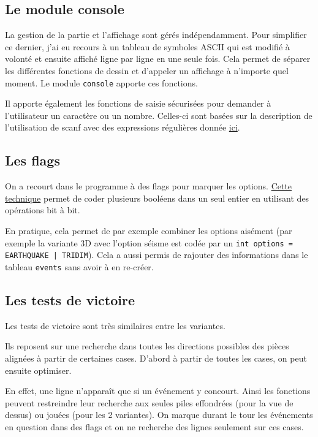 \documentclass[a4paper, titlepage]{article}
\begin{document}
\subsection{Le module console}
La gestion de la partie et l'affichage sont gérés indépendamment. Pour simplifier ce dernier, j'ai eu recours à un tableau de symboles ASCII qui est modifié à volonté et ensuite affiché ligne par ligne en une seule fois. Cela permet de séparer les différentes fonctions de dessin et d'appeler un affichage à n'importe quel moment. Le module \texttt{console} apporte ces fonctions.

Il apporte également les fonctions de saisie sécurisées pour demander à l'utilisateur un caractère ou un nombre. Celles-ci sont basées sur la description de l'utilisation de scanf avec des expressions régulières donnée \href{https://openclassrooms.com/courses/la-saisie-securisee-avec-scanf}{ici}.

\subsection{Les flags}
On a recourt dans le programme à des flags pour marquer les options. \href{https://openclassrooms.com/courses/les-flags-4}{Cette technique} permet de coder plusieurs booléens dans un seul entier en utilisant des opérations bit à bit. 

En pratique, cela permet de par exemple combiner les options aisément (par exemple la variante 3D avec l'option séisme est codée par un \texttt{int options = EARTHQUAKE | TRIDIM}). Cela a aussi permis de rajouter des informations dans le tableau \texttt{events} sans avoir à en re-créer.

\subsection{Les tests de victoire}
Les tests de victoire sont très similaires entre les variantes.

Ils reposent sur une recherche dans toutes les directions possibles des pièces alignées à partir de certaines cases. D'abord à partir de toutes les cases, on peut ensuite optimiser.

En effet, une ligne n'apparaît que si un événement y concourt. Ainsi les fonctions peuvent restreindre leur recherche aux seules piles effondrées (pour la vue de dessus) ou jouées (pour les 2 variantes). On marque durant le tour les événements en question dans des flags et on ne recherche des lignes seulement sur ces cases.  
\end{document}

